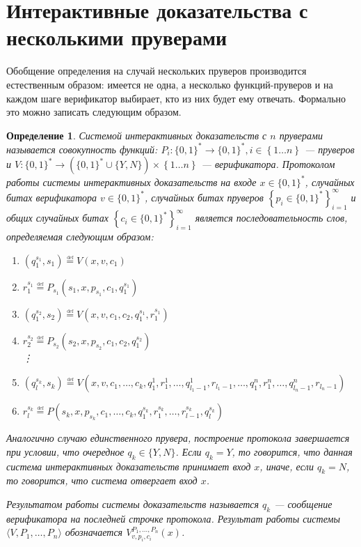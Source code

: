 \documentclass[14pt, a4paper]{extreport}
\newtheorem{definition}{\indent Определение}
\newcommand{\word}{\{0, 1\}^*}
\newcommand{\defeq}{\overset{\underset{\mathrm{def}}{}}{=}}
\newcommand{\set}[1]{\left\{#1\right\}}
\begin{document}
\section{Интерактивные доказательства с несколькими пруверами}
Обобщение определения на случай нескольких пруверов производится естественным образом: имеется не одна, а несколько функций-пруверов и на каждом шаге верификатор выбирает, кто из них будет ему отвечать. Формально это можно записать следующим образом.
\begin{definition}\label{mip_system}
    Системой интерактивных доказательств с $n$ пруверами называется совокупность функций: $P_i: \word \longrightarrow \word, i \in \set{1\ldots n}$ --- пруверов и $V: \word \longrightarrow \left(\word \cup \{Y, N\}\right) \times \set{1 \dots n}$ --- верификатора. Протоколом работы системы интерактивных доказательств на входе $x \in \word$, случайных битах верификатора $v \in \word$, случайных битах пруверов $\left\{p_i\in \word\right\}_{i=1}^{\infty}$ и общих случайных битах $\left\{c_i\in \word\right\}_{i=1}^{\infty}$ является последовательность слов, определяемая следующим образом:
    \begin{enumerate}
        \item $(q^{s_1}_1, s_1) \defeq V(x, v, c_1)$
        \item $r^{s_1}_1 \defeq P_{s_1}(s_1, x, p_{s_1}, c_1, q^{s_1}_1)$
        \item $(q^{s_2}_1, s_2) \defeq V(x, v, c_1, c_2, q^{s_1}_1, r^{s_1}_1)$
        \item $r^{s_2}_2 \defeq P_{s_2}(s_2, x, p_{s_2}, c_1, c_2, q^{s_2}_1)$\\
            \vdots
        \item[(2k-1).] $(q^{s_k}_l, s_k) \defeq V(x, v, c_1, \ldots, c_k, q^1_1, r^1_1, \ldots, q^1_{l_1-1}, r_{l_1-1}, \ldots, q^n_1, r^n_1, \ldots, q^n_{l_n-1}, r_{l_n-1})$
        \item[(2k).] $r^{s_k}_l \defeq P(s_k, x, p_{s_k}, c_1, \ldots, c_k, q^{s_k}_1, r^{s_k}_1, \ldots, r^{s_k}_{l-1}, q^{s_k}_l)$
    \end{enumerate}
    Аналогично случаю единственного прувера, построение протокола завершается при условии, что очередное $q_k \in \{Y, N\}$. Если $q_k = Y$, то говорится, что данная система интерактивных доказательств принимает вход $x$, иначе, если $q_k = N$, то говорится, что система отвергает вход $x$.

    Результатом работы системы доказательств называется $q_k$ --- сообщение верификатора на последней строчке протокола. Результат работы системы $\langle V, P_1, \ldots, P_n\rangle$ обозначается $V^{P_1, \ldots, P_n}_{v, p_i, c_i}(x)$.
\end{definition}
\end{document}
